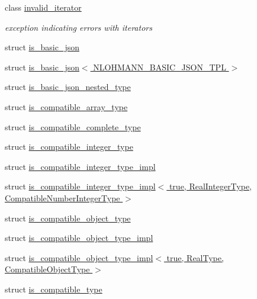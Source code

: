 \begin{DoxyCompactItemize}
class \hyperlink{classnlohmann_1_1detail_1_1invalid__iterator}{invalid\+\_\+iterator}
\begin{DoxyCompactList}\small\item\em exception indicating errors with iterators \end{DoxyCompactList}\item 
struct \hyperlink{structnlohmann_1_1detail_1_1is__basic__json}{is\+\_\+basic\+\_\+json}
\item 
struct \hyperlink{structnlohmann_1_1detail_1_1is__basic__json_3_01_n_l_o_h_m_a_n_n___b_a_s_i_c___j_s_o_n___t_p_l_01_4}{is\+\_\+basic\+\_\+json$<$ N\+L\+O\+H\+M\+A\+N\+N\+\_\+\+B\+A\+S\+I\+C\+\_\+\+J\+S\+O\+N\+\_\+\+T\+P\+L $>$}
\item 
struct \hyperlink{structnlohmann_1_1detail_1_1is__basic__json__nested__type}{is\+\_\+basic\+\_\+json\+\_\+nested\+\_\+type}
\item 
struct \hyperlink{structnlohmann_1_1detail_1_1is__compatible__array__type}{is\+\_\+compatible\+\_\+array\+\_\+type}
\item 
struct \hyperlink{structnlohmann_1_1detail_1_1is__compatible__complete__type}{is\+\_\+compatible\+\_\+complete\+\_\+type}
\item 
struct \hyperlink{structnlohmann_1_1detail_1_1is__compatible__integer__type}{is\+\_\+compatible\+\_\+integer\+\_\+type}
\item 
struct \hyperlink{structnlohmann_1_1detail_1_1is__compatible__integer__type__impl}{is\+\_\+compatible\+\_\+integer\+\_\+type\+\_\+impl}
\item 
struct \hyperlink{structnlohmann_1_1detail_1_1is__compatible__integer__type__impl_3_01true_00_01_real_integer_type78b0ba77f36a8c8169cdb79b01d1a4bf}{is\+\_\+compatible\+\_\+integer\+\_\+type\+\_\+impl$<$ true, Real\+Integer\+Type, Compatible\+Number\+Integer\+Type $>$}
\item 
struct \hyperlink{structnlohmann_1_1detail_1_1is__compatible__object__type}{is\+\_\+compatible\+\_\+object\+\_\+type}
\item 
struct \hyperlink{structnlohmann_1_1detail_1_1is__compatible__object__type__impl}{is\+\_\+compatible\+\_\+object\+\_\+type\+\_\+impl}
\item 
struct \hyperlink{structnlohmann_1_1detail_1_1is__compatible__object__type__impl_3_01true_00_01_real_type_00_01_compatible_object_type_01_4}{is\+\_\+compatible\+\_\+object\+\_\+type\+\_\+impl$<$ true, Real\+Type, Compatible\+Object\+Type $>$}
\item 
struct \hyperlink{structnlohmann_1_1detail_1_1is__compatible__type}{is\+\_\+compatible\+\_\+type}

\end{DoxyCompactItemize}
